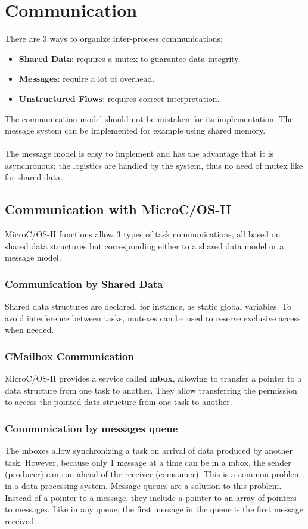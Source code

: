 \section{Communication}
There are 3 ways to organize inter-process communications:
\begin{itemize}
	\item \textbf{Shared Data}: requires a mutex to guarantee data integrity.
	\item \textbf{Messages}: require a lot of overhead.
	\item \textbf{Unstructured Flows}: requires correct interpretation.
\end{itemize}
The communication model should not be mistaken for its implementation. The message system can be implemented for example using shared memory.
\\\\
The message model is easy to implement and has the advantage that it is asynchronous: the logistics are handled by the system, thus no need of mutex like for shared data.

\subsection{Communication with MicroC/OS-II}
MicroC/OS-II functions allow 3 types of  task communications, all based on shared data structures but corresponding either to a shared data model or a message model.

\subsubsection{Communication by Shared Data}
Shared data structures are declared, for instance, as static global variables. To avoid interference between tasks, mutexes can be used to reserve exclusive access when needed.

\subsubsection{CMailbox Communication}
MicroC/OS-II provides a service called \textbf{mbox}, allowing to transfer a pointer to a data structure from one task to another. They allow transferring the permission to access  the pointed data structure from one task to another.


\subsubsection{Communication by messages queue}
The mboxes allow synchronizing a task on arrival of data produced by another task. However, because only 1 message at a time can be in a mbox, the sender (producer) can run ahead of the receiver (comsumer). This is a common problem in a data processing system. 
Message queues are a solution to this problem. Instead of a pointer to a message, they include a pointer to an array of pointers to messages. Like in any queue, the first message in the queue is the first message received.

